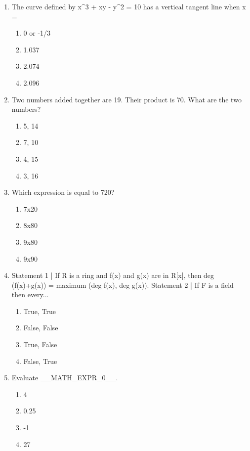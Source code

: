 \documentclass[12pt]{article}
\begin{document}
\begin{enumerate}[label=\arabic*.]
\begin{enumerate}[label=(\alph*)]
    \item -2
    \item -4
    \item -1
    \item 1
\end{enumerate}
\item The curve defined by x\^{}3 + xy - y\^{}2 = 10 has a vertical tangent line when x =
\begin{enumerate}[label=(\alph*)]
    \item 0 or -1/3
    \item 1.037
    \item 2.074
    \item 2.096
\end{enumerate}
\item Two numbers added together are 19. Their product is 70. What are the two numbers?
\begin{enumerate}[label=(\alph*)]
    \item 5, 14
    \item 7, 10
    \item 4, 15
    \item 3, 16
\end{enumerate}
\item Which expression is equal to 720?
\begin{enumerate}[label=(\alph*)]
    \item 7x20
    \item 8x80
    \item 9x80
    \item 9x90
\end{enumerate}
\item Statement 1 | If R is a ring and f(x) and g(x) are in R[x], then deg (f(x)+g(x)) = maximum (deg f(x), deg g(x)). Statement 2 | If F is a field then every...
\begin{enumerate}[label=(\alph*)]
    \item True, True
    \item False, False
    \item True, False
    \item False, True
\end{enumerate}
\item Evaluate \_\_MATH\_EXPR\_0\_\_.
\begin{enumerate}[label=(\alph*)]
    \item 4
    \item 0.25
    \item -1
    \item 27
\end{enumerate}
\end{enumerate}
\end{document}
